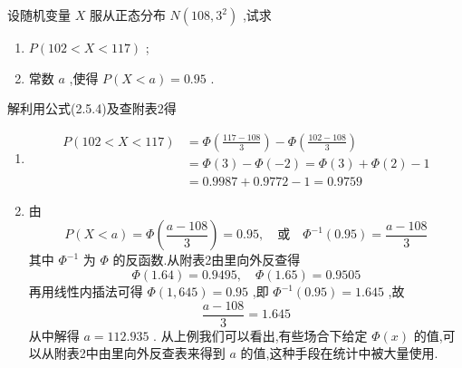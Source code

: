 \begin{example}
	设随机变量 $ X $ 服从正态分布 $ N(108,3^{2}) $ ,试求
	\begin{enumerate}
		\item $ P(102<X<117) $ ;
		\item 常数 $ a $ ,使得 $ P(X<a)=0.95 $ .
	\end{enumerate}
	
	解利用公式(2.5.4)及查附表2得
	\begin{enumerate}
		\item \[
		\begin{aligned} P(102<X<117) &=\Phi\left(\frac{117-108}{3}\right)-\Phi\left(\frac{102-108}{3}\right) \\ &=\Phi(3)-\Phi(-2)=\Phi(3)+\Phi(2)-1 \\ &=0.9987+0.9772-1=0.9759 \end{aligned}
		\]
		\item 由
		\[
		P(X<a)=\Phi\left(\frac{a-108}{3}\right)=0.95, \quad \text{或} \quad \Phi^{-1}(0.95)=\frac{a-108}{3}
		\]
		其中 $ \Phi^{-1} $ 为 $ \Phi $ 的反函数.从附表2由里向外反查得
		\[
		\Phi(1.64)=0.9495, \quad \Phi(1.65)=0.9505
		\]
		再用线性内插法可得 $ \Phi(1,645)=0.95 $ ,即 $ \Phi^{-1}(0.95)=1.645 $ ,故
		\[
		\frac{a-108}{3}=1.645
		\]
		从中解得 $ a=112.935 $ .
		从上例我们可以看出,有些场合下给定 $ \Phi(x) $ 的值,可以从附表2中由里向外反查表来得到 $ a $ 的值,这种手段在统计中被大量使用.
	\end{enumerate}
\end{example}

